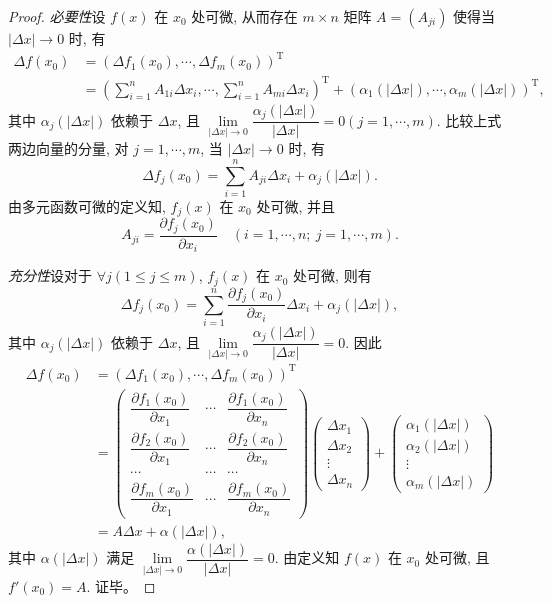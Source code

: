 \documentclass[UTF8,12pt,a4paper,fontset=fandol]{ctexart}
\begin{document}
\begin{proof}\quad \emph{必要性}\quad 设 $f(x)$ 在 $x_0$ 处可微, 从而存在 $m\times n$ 矩阵 $A=(A_{ji})$ 使得当 $|\Delta x|\to0$ 时, 有
\[
\begin{aligned}
  \Delta f(x_0)
  &=(\Delta f_1(x_0),\cdots,\Delta f_m(x_0))^\mathrm T\\
  &=\left(\sum_{i=1}^n A_{1i}\Delta x_i,\cdots,\sum_{i=1}^n A_{mi}\Delta x_i\right)^\mathrm T
  +(\alpha_1(|\Delta x|),\cdots,\alpha_m(|\Delta x|))^\mathrm T,
\end{aligned}
\]
其中 $\alpha_j(|\Delta x|)$ 依赖于 $\Delta x$, 且 $\lim\limits_{|\Delta x|\to0}\dfrac{\alpha_j(|\Delta x|)}{|\Delta x|}=0(j=1,\cdots,m)$. 比较上式两边向量的分量, 对 $j=1,\cdots,m$, 当 $|\Delta x|\to0$ 时, 有
\[
  \Delta f_j(x_0)=\sum_{i=1}^n A_{ji}\Delta x_i+\alpha_j(|\Delta x|).
\]
由多元函数可微的定义知, $f_j(x)$ 在 $x_0$ 处可微, 并且
\[
  A_{ji}=\frac{\partial f_j(x_0)}{\partial x_i}
  \quad (i=1,\cdots,n;\ j=1,\cdots,m).
\]

\emph{充分性}\quad 设对于 $\forall j(1\leqslant j\leqslant m)$, $f_j(x)$ 在 $x_0$ 处可微, 则有
\[
  \Delta f_j(x_0)=\sum_{i=1}^n\frac{\partial f_j(x_0)}{\partial x_i}\Delta x_i+\alpha_j(|\Delta x|),
\]
其中 $\alpha_j(|\Delta x|)$ 依赖于 $\Delta x$, 且 $\lim\limits_{|\Delta x|\to0}\dfrac{\alpha_j(|\Delta x|)}{|\Delta x|}=0$. 因此
\[
\begin{aligned}
  \Delta f(x_0)
  &=(\Delta f_1(x_0),\cdots,\Delta f_m(x_0))^\mathrm T\\
  &=
  \begin{pmatrix}
    \dfrac{\partial f_1(x_0)}{\partial x_1}&\cdots&\dfrac{\partial f_1(x_0)}{\partial x_n}\\
    \dfrac{\partial f_2(x_0)}{\partial x_1}&\cdots&\dfrac{\partial f_2(x_0)}{\partial x_n}\\
    \cdots&\cdots&\cdots\\
    \dfrac{\partial f_m(x_0)}{\partial x_1}&\cdots&\dfrac{\partial f_m(x_0)}{\partial x_n}
  \end{pmatrix}
  \begin{pmatrix}
    \Delta x_1\\
    \Delta x_2\\
    \vdots\\
    \Delta x_n
  \end{pmatrix}
  +
  \begin{pmatrix}
    \alpha_1(|\Delta x|)\\
    \alpha_2(|\Delta x|)\\
    \vdots\\
    \alpha_m(|\Delta x|)
  \end{pmatrix}\\
  &=A\Delta x+\alpha(|\Delta x|),
\end{aligned}
\]
其中 $\alpha(|\Delta x|)$ 满足 $\lim\limits_{|\Delta x|\to0}\dfrac{\alpha(|\Delta x|)}{|\Delta x|}=0$. 由定义知 $f(x)$ 在 $x_0$ 处可微, 且 $f'(x_0)=A$. 证毕。


\end{proof}
\end{document}
